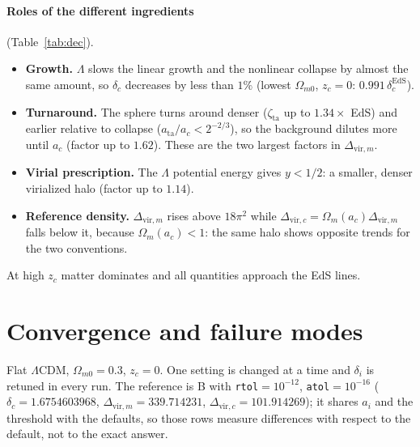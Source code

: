 \documentclass[11pt,a4paper]{article}
\newcommand{\res}{../results/exercise_4}
\begin{document}
\paragraph{Roles of the different ingredients} (Table~\ref{tab:dec}).
\begin{itemize}
  \item \textbf{Growth.} $\Lambda$ slows the linear growth and the nonlinear collapse by almost the same amount, so $\delta_c$ decreases by less than $1\%$ (lowest $\Omega_{m0}$, $z_c=0$: $0.991\,\delta_c^\mathrm{EdS}$).
  \item \textbf{Turnaround.} The sphere turns around denser ($\zeta_\mathrm{ta}$ up to $1.34\times$ EdS) and earlier relative to collapse ($a_\mathrm{ta}/a_c<2^{-2/3}$), so the background dilutes more until $a_c$ (factor up to $1.62$). These are the two largest factors in $\Delta_{\mathrm{vir},m}$.
  \item \textbf{Virial prescription.} The $\Lambda$ potential energy gives $y<1/2$: a smaller, denser virialized halo (factor up to $1.14$).
  \item \textbf{Reference density.} $\Delta_{\mathrm{vir},m}$ rises above $18\pi^2$ while $\Delta_{\mathrm{vir},c}=\Omega_m(a_c)\Delta_{\mathrm{vir},m}$ falls below it, because $\Omega_m(a_c)<1$: the same halo shows opposite trends for the two conventions.
\end{itemize}
At high $z_c$ matter dominates and all quantities approach the EdS lines.

\section{Convergence and failure modes}
\label{sec:conv}

Flat $\Lambda$CDM, $\Omega_{m0}=0.3$, $z_c=0$. One setting is changed at a time and $\delta_i$ is retuned in every run.
The reference is B with \texttt{rtol}$=10^{-12}$, \texttt{atol}$=10^{-16}$ ($\delta_c = 1.6754603968$, $\Delta_{\mathrm{vir},m} = 339.714231$, $\Delta_{\mathrm{vir},c}=101.914269$); it shares $a_i$ and the threshold with the defaults, so those rows measure differences with respect to the default, not to the exact answer.

\begin{table}[h]
  \centering
  \caption{Relative change of $\delta_c$ with respect to the reference, cross-formulation difference and worst event residual. Threshold setting: $\delta_\infty$ / $\epsilon$; tolerances: \texttt{rtol} / \texttt{atol}; ``loose atol'' uses \texttt{rtol}$=10^{-10}$; ``method'' uses \texttt{rtol}$=10^{-6}$.}
  \label{tab:convdc}
  \resizebox{\linewidth}{!}{}
\end{table}
\end{document}

